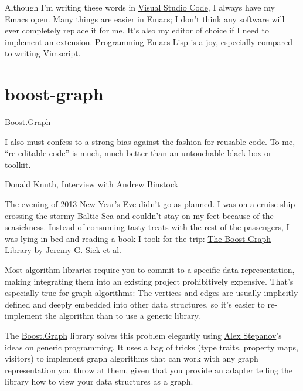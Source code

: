 \documentclass{article}
\begin{document}
Although I'm writing these words in \href{https://code.visualstudio.com/}{Visual Studio Code}, I always have my Emacs open.
Many things are easier in Emacs; I don't think any software will ever completely replace it for me.
It's also my editor of choice if I need to implement an extension.
Programming Emacs Lisp is a joy, especially compared to writing Vimscript.

\section{boost-graph}{Boost.Graph}

\epigraph{
  I also must confess to a strong bias against the fashion for reusable code.
  To me, ``re-editable code'' is much, much better than an untouchable black box or toolkit.
}{
  Donald Knuth, \href{https://www.informit.com/articles/article.aspx?p=1193856}{Interview with Andrew Binstock}
}

The evening of 2013 New Year's Eve didn't go as planned.
I was on a cruise ship crossing the stormy Baltic Sea and couldn't stay on my feet because of the seasickness.
Instead of consuming tasty treats with the rest of the passengers, I was lying in bed and reading a book I took for the trip: \href{https://www.goodreads.com/book/show/1705806.The_Boost_Graph_Library}{The Boost Graph Library} by Jeremy G. Siek et al.

Most algorithm libraries require you to commit to a specific data representation, making integrating them into an existing project prohibitively expensive.
That's especially true for graph algorithms: The vertices and edges are usually implicitly defined and deeply embedded into other data structures, so it's easier to re-implement the algorithm than to use a generic library.

The \href{https://www.boost.io/libraries/graph/}{Boost.Graph} library solves this problem elegantly using \href{https://en.wikipedia.org/wiki/Alexander_Stepanov}{Alex Stepanov}'s ideas on generic programming.
It uses a bag of tricks (type traits, property maps, visitors) to implement graph algorithms that can work with any graph representation you throw at them, given that you provide an adapter telling the library how to view your data structures as a graph.
\end{document}
